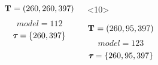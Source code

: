 \begin{frame}
\begin{columns}[c]
\begin{onlyenv}
\begin{minipage}[c][0.5\textheight][c]{\linewidth}
                \begin{displaybox}[0.95\linewidth]
                    \begin{minipage}[c][0.45\textheight][c]{0.95\linewidth}
                        \[
                            \mathbf{T_{}} = (260,260,397)
                        \]\vspace{0mm}
                        \[
                            model = 112
                        \]\vspace{0mm}
                        \[
                            \boldsymbol{\tau_{}} = \{260,397\}
                        \]\vspace{0mm}
                    \end{minipage}
                \end{displaybox}
            \end{minipage}
        \end{onlyenv}
        \begin{onlyenv}<10>
            \begin{minipage}[c][0.5\textheight][c]{\linewidth}
                \begin{displaybox}[0.95\linewidth]
                    \begin{minipage}[c][0.45\textheight][c]{0.95\linewidth}
                        \[
                            \mathbf{T_{}} = (260,95,397)
                        \]\vspace{0mm}
                        \[
                            model = 123
                        \]\vspace{0mm}
                        \[
                            \boldsymbol{\tau_{}} = \{260,95,397\}
                        \]\vspace{0mm}
                    \end{minipage}
                \end{displaybox}
            \end{minipage}
        \end{onlyenv}

\end{columns}
\end{frame}
